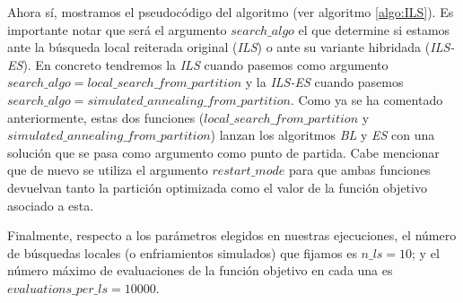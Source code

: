 \documentclass[11pt,a4paper]{article}
\begin{document}
	Ahora sí, mostramos el pseudocódigo del algoritmo (ver algoritmo \ref{algo:ILS}). Es importante notar que será el argumento $search\_algo$ el que determine si estamos ante la búsqueda local reiterada original (\textit{ILS}) o ante su variante hibridada (\textit{ILS-ES}). En concreto tendremos la \textit{ILS} cuando pasemos como argumento $search\_algo=local\_search\_from\_partition$ y la \textit{ILS-ES} cuando  pasemos $search\_algo=simulated\_annealing\_from\_partition$. Como ya se ha comentado anteriormente, estas dos funciones ($local\_search\_from\_partition$ y $simulated\_annealing\_from\_partition$) lanzan los algoritmos \textit{BL} y \textit{ES} con una solución que se pasa como argumento como punto de partida. Cabe mencionar que de nuevo se utiliza el argumento $restart\_mode$ para que ambas funciones devuelvan tanto la partición optimizada como el valor de la función objetivo asociado a esta. 
	
	Finalmente, respecto a los parámetros elegidos en nuestras ejecuciones, el número de búsquedas locales (o enfriamientos simulados) que fijamos es $n\_ls = 10$; y el número máximo de evaluaciones de la función objetivo en cada una es $evaluations\_per\_ls=10000$.
	
\end{document}
